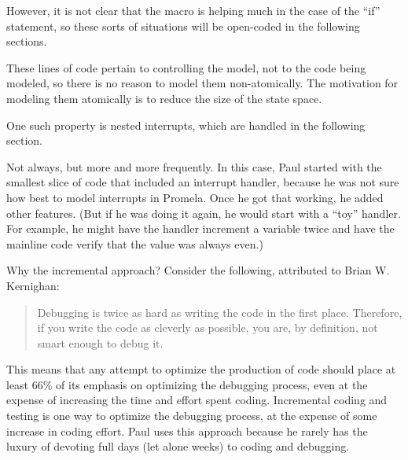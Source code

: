 	However, it is not clear that the macro is helping much in the case
	of the ``if'' statement, so these sorts of situations will
	be open-coded in the following sections.


	These lines of code pertain to controlling the
	model, not to the code being modeled, so there is no reason to
	model them non-atomically.
	The motivation for modeling them atomically is to reduce the size
	of the state space.


	One such property is nested interrupts,
	which are handled in the following section.


	Not always, but more and more frequently.
	In this case, Paul started with the smallest slice of code that included
	an interrupt handler, because he was not sure how best to model interrupts
	in Promela.
	Once he got that working, he added other features.
	(But if he was doing it again, he would start with a ``toy'' handler.
	For example, he might have the handler increment a variable twice and
	have the mainline code verify that the value was always even.)

	Why the incremental approach?
	Consider the following, attributed to Brian W. Kernighan:

	\begin{quote}
		Debugging is twice as hard as writing the code in the first
		place. Therefore, if you write the code as cleverly as possible,
		you are, by definition, not smart enough to debug it.
	\end{quote}

	This means that any attempt to optimize the production of code should
	place at least 66\% of its emphasis on optimizing the debugging process,
	even at the expense of increasing the time and effort spent coding.
	Incremental coding and testing is one way to optimize the debugging
	process, at the expense of some increase in coding effort.
	Paul uses this approach because he rarely has the luxury of
	devoting full days (let alone weeks) to coding and debugging.


